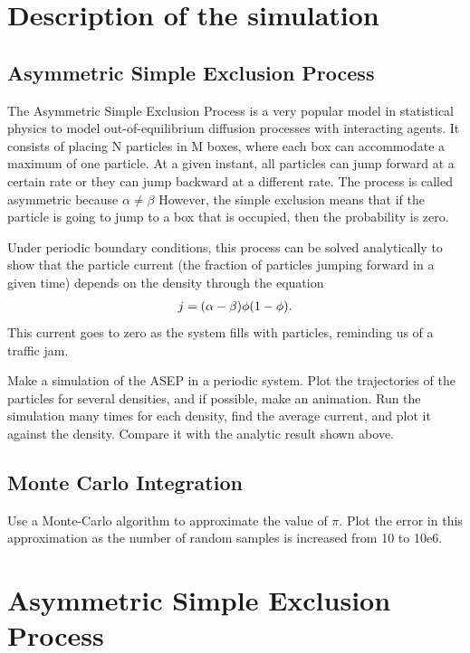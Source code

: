 \documentclass[main.tex]{subfiles}
\begin{document}
\section{Description of the simulation}

\subsection{Asymmetric Simple Exclusion Process}

The Asymmetric Simple Exclusion Process is a very popular model in statistical physics to model out-of-equilibrium diffusion processes with interacting agents. 
It consists of placing N particles in M boxes, where each box can accommodate a maximum of one particle. 
At a given instant, all particles can jump forward at a certain rate or they can jump backward at a different rate. 
The process is called asymmetric because $\alpha\neq\beta$
However, the simple exclusion means that if the particle is going to jump to a box that is occupied, then the probability is zero.

Under periodic boundary conditions, this process can be solved analytically to show that the particle current (the fraction of particles jumping forward in a given time) depends on the density through the equation 
\begin{gather} j = \qty(\alpha-\beta)\phi\qty(1-\phi)\label{eqn6:current}.\end{gather}
This current goes to zero as the system fills with particles, reminding us of a traffic jam. 

Make a simulation of the ASEP in a periodic system. 
Plot the trajectories of the particles for several densities, and if possible, make an animation. 
Run the simulation many times for each density, find the average current, and plot it against the density. 
Compare it with the analytic result shown above. 

\subsection{Monte Carlo Integration}

Use a Monte-Carlo algorithm to approximate the value of $\pi$. 
Plot the error in this approximation as the number of random samples is increased from 10 to 10e6.

\section{Asymmetric Simple Exclusion Process}\label{sec:asep}
\end{document}
